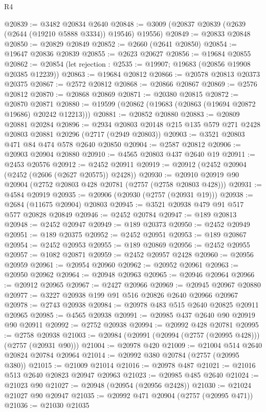 \begin{lexlean}{R4}
\begin{coremodule}
@20839 := @3482 @20834 @2640
@20848 := @3009 (@20837 @20839 (@2639 (@2644 (@19210 @5888 @3334)) @19546) @19556)
@20849 := @20833 @20848
@20850 := @20829 @20849
@20852 := @2660 (@2641 @20850)
@20854 := @19647 @20836 @20839
@20855 := @2623 @20627
@20856 := @19684 @20855
@20862 := @20854 (let rejection : @2535 := @19907; @19683 (@20856 @19908 @20385 @12239))
@20863 := @19684 @20812
@20866 := @20578 @20813 @20373 @20375
@20867 := @2572 @20812
@20868 := @20866 @20867
@20869 := @2576 @20812
@20870 := @20868 @20869
@20871 := @20380 @20815
@20872 := @20870 @20871
@20880 := @19599 (@20862 (@19683 (@20863 (@19694 @20872 @19686) @20242 @12213)))
@20881 := @20852 @20880
@20883 := @20809 @20881 @20284
@20896 := @2934 @20803 @20148 @215 @135 @579 @271 @2428 @20803 @20881 @20296 (@2717 (@2949 @20803))
@20903 := @3521 @20803 @471 @84 @474 @578 @2640 @20850
@20904 := @2587 @20812
@20906 := @20903 @20904 @20880
@20910 := @4565 @20803 @437 @2640 @19
@20911 := @2453 @20576
@20912 := @2452 @20911
@20919 := @20912 (@2452 @20904 (@2452 (@2606 (@2627 @20575)) @2428))
@20930 := @20910 @20919 @90 @20904 (@2752 @20803 @428 @20781 (@2757 (@2758 @20803 @428)))
@20931 := @4584 @20919
@20935 := @20906 (@20930 (@2757 (@20931 @19)))
@20938 := @2684 (@11675 @20904) @20803
@20945 := @3521 @20938 @479 @91 @517 @577 @20828 @20849
@20946 := @2452 @20784
@20947 := @189 @20813
@20948 := @2452 @20947
@20949 := @189 @20373
@20950 := @2452 @20949
@20951 := @189 @20375
@20952 := @2452 @20951
@20953 := @189 @20867
@20954 := @2452 @20953
@20955 := @189 @20869
@20956 := @2452 @20955
@20957 := @1082 @20871
@20959 := @2452 @20957 @2428
@20960 := @20956 @20959
@20961 := @20954 @20960
@20962 := @20952 @20961
@20963 := @20950 @20962
@20964 := @20948 @20963
@20965 := @20946 @20964
@20966 := @20912 @20965
@20967 := @2427 @20966
@20969 := @20945 @20967 @20880
@20977 := @3227 @20938 @199 @91 @516 @20826 @2640 @20966 @20967
@20978 := @2743 @20938
@20984 := @20978 @483 @515 @2640 @20825 @20911 @20965
@20985 := @4565 @20938
@20991 := @20985 @437 @2640 @90 @20919 @90 @20911
@20992 := @2752 @20938
@20994 := @20992 @428 @20781
@20995 := @2758 @20938
@21003 := @20984 (@20991 (@20994 (@2757 (@20995 @428))) (@2757 (@20931 @90)))
@21004 := @20978 @420
@21009 := @21004 @514 @2640 @20824 @20784 @20964
@21014 := @20992 @380 @20784 (@2757 (@20995 @380))
@21015 := @21009 @21014
@21016 := @20978 @487
@21021 := @21016 @513 @2640 @20823 @20947 @20963
@21023 := @20985 @485 @2640
@21024 := @21023 @90
@21027 := @20948 (@20954 (@20956 @2428))
@21030 := @21024 @21027 @90 @20947
@21035 := @20992 @471 @20904 (@2757 (@20995 @471))
@21036 := @21030 @21035

\end{coremodule}
\end{lexlean}
